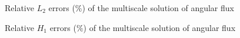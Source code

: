 \documentclass[preprint]{elsarticle}
\begin{document}
\begin{figure}[ht]
	\centering
	\quad
	\caption{Relative $L_2$ errors ($\%$) of the multiscale solution of angular flux}
	\label{small_L2}
\end{figure}

\begin{figure}[ht]
	\centering
	\quad
	\caption{Relative $H_1$ errors ($\%$) of the multiscale solution of angular flux}
	\label{small_H1}
\end{figure}
\end{document}
